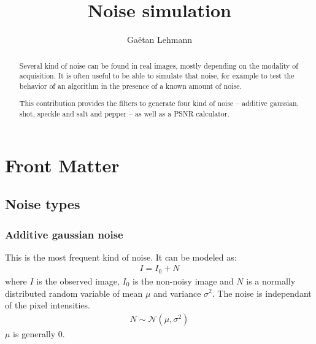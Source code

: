 \documentclass{InsightArticle}
\title{Noise simulation}
\author{Ga\"etan Lehmann}
\newcommand{\IJhandlerIDnumber}{3158}
\begin{document}
%
% 
\IJhandlefooter{\IJhandlerIDnumber}

\maketitle

\ifhtml
\chapter*{Front Matter\label{front}}
\fi


\begin{abstract}
\noindent
Several kind of noise can be found in real images, mostly depending on the modality
of acquisition. It is often useful to be able to simulate that noise, for example
to test the behavior of an algorithm in the presence of a known amount of noise.

This contribution provides the filters to generate four kind of noise -- additive
gaussian, shot, speckle and salt and pepper -- as well as a PSNR calculator.
\end{abstract}

\IJhandlenote{\IJhandlerIDnumber}

\tableofcontents

\section{Noise types}

\subsection{Additive gaussian noise}

This is the most frequent kind of noise. It can be modeled as:
\begin{eqnarray}
\label{eq:gauss}
I = I_0 + N
\end{eqnarray}
where $I$ is the observed image, $I_0$ is the non-noisy image and $N$ is a normally distributed random
variable of mean $\mu$ and variance $\sigma^2$. The noise is independant of the pixel intensities.
\begin{eqnarray}
N \sim \mathcal{N}(\mu,\sigma^2)
\end{eqnarray}
$\mu$ is generally $0$.
\end{document}
